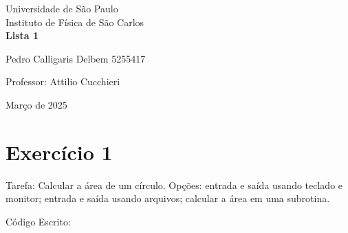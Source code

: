 \documentclass[12pt, a4paper]{article} %
\begin{document}
	
	\begin{titlepage}
		\begin{center}
\Huge{Universidade de São Paulo}\\
\large{Instituto de Física de São Carlos}\\
\vspace{20pt}
\vspace{200pt}
\textbf{Lista 1}\\
\vspace{8cm}
		\end{center}

\begin{flushleft}
\begin{tabbing}
Pedro Calligaris Delbem 5255417\\
\end{tabbing}
\vspace{0.5cm}
Professor: Attilio Cucchieri\\		
		\end{flushleft}
	
		\begin{center}
			\vspace{\fill}
	Março de 2025	
		\end{center}
	\end{titlepage}

	\tableofcontents 
	\thispagestyle{empty}
	\newpage
\section{Exerc\'icio 1}

Tarefa: Calcular a \'area de um c\'irculo. Op\c{c}\~oes: entrada e sa\'ida usando teclado e monitor; entrada e sa\'ida usando arquivos; calcular a  \'area em uma subrotina.

C\'odigo Escrito:

\end{document}
